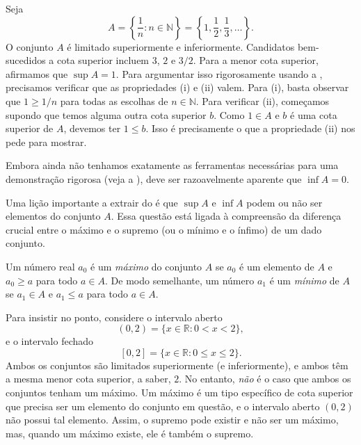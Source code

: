 \begin{example}\label{ex:sup-de-1n}
Seja
\[
A = \left\{ \frac{1}{n} : n \in \mathbb{N} \right\} = \left\{ 1, \frac{1}{2}, \frac{1}{3}, \dots \right\}.
\]
O conjunto $A$ é limitado superiormente e inferiormente. Candidatos bem-sucedidos a cota superior incluem $3$, $2$ e $3/2$. Para a menor cota superior, afirmamos que $\sup A = 1$. Para argumentar isso rigorosamente usando a , precisamos verificar que as propriedades (i) e (ii) valem. Para (i), basta observar que $1 \geq 1/n$ para todas as escolhas de $n \in \mathbb{N}$. Para verificar (ii), começamos supondo que temos alguma outra cota superior $b$. Como $1 \in A$ e $b$ é uma cota superior de $A$, devemos ter $1 \leq b$. Isso é precisamente o que a propriedade (ii) nos pede para mostrar.

Embora ainda não tenhamos exatamente as ferramentas necessárias para uma demonstração rigorosa (veja a ), deve ser razoavelmente aparente que $\inf A = 0$.
\end{example}

Uma lição importante a extrair do  é que $\sup A$ e $\inf A$ podem ou não ser elementos do conjunto $A$. Essa questão está ligada à compreensão da diferença crucial entre o máximo e o supremo (ou o mínimo e o ínfimo) de um dado conjunto.

\begin{definition}\label{def:maximo-minimo}
Um número real $a_{0}$ é um \textit{máximo} do conjunto $A$ se $a_{0}$ é um elemento de $A$ e $a_{0} \geq a$ para todo $a \in A$. De modo semelhante, um número $a_{1}$ é um \textit{mínimo} de $A$ se $a_{1} \in A$ e $a_{1} \leq a$ para todo $a \in A$.   
\end{definition}

\begin{example}\label{ex:maximo-vs-supremo}
Para insistir no ponto, considere o intervalo aberto  
\[
(0, 2) = \{ x \in \mathbb{R} : 0 < x < 2 \},
\]
e o intervalo fechado 
\[
[0, 2] = \{ x \in \mathbb{R} : 0 \leq x \leq 2 \}.
\]
Ambos os conjuntos são limitados superiormente (e inferiormente), e ambos têm a mesma menor cota superior, a saber, $2$. No entanto, \textit{não} é o caso que ambos os conjuntos tenham um máximo. Um máximo é um tipo específico de cota superior que precisa ser um elemento do conjunto em questão, e o intervalo aberto $(0, 2)$ não possui tal elemento. Assim, o supremo pode existir e não ser um máximo, mas, quando um máximo existe, ele é também o supremo. 
\end{example}

